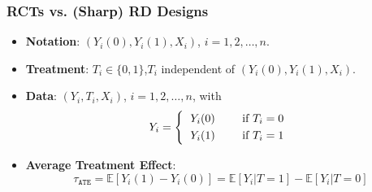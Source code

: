 \documentclass[9pt]{beamer}
\newcommand{\E}{\mathbb{E}}
\begin{document}
\begin{frame}[t]\frametitle{RCTs vs. (Sharp) RD Designs}
	\bigskip
	\begin{minipage}{\textwidth}
	\begin{itemize}
		\item \textbf{Notation}: $(Y_i(0),Y_i(1),X_i)$, $i=1,2,\dots,n$.\bigskip
		
		\item \textbf{Treatment}: $T_i\in\{0,1\}$,\qquad$T_i$ independent of $(Y_i(0),Y_i(1),X_i)$.\bigskip
		
		\item \textbf{Data}: $(Y_{i},T_{i},X_{i})$, $i=1,2,\dots,n$, with
		\[
		Y_{i}=\left\{
		\begin{tabular}
			[c]{lll}%
			$Y_{i}(0)$ &  & if $T_{i}=0\smallskip$\\
			$Y_{i}(1)$ &  & if $T_{i}=1$
		\end{tabular}
		\right.
		\]
	\end{itemize}\bigskip
	\end{minipage}
	\begin{minipage}{\textwidth}
	\begin{itemize}
		\item \textbf{Average Treatment Effect}:
		\[\tau_{\mathtt{ATE}}=\E[Y_{i}(1)-Y_{i}(0)]=\E[Y_{i}|T=1]-\E[Y_{i}|T=0]\]
		
	\end{itemize}
	\end{minipage}	
\end{frame}
\end{document}
